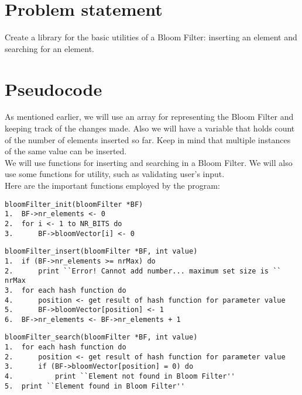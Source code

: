 \documentclass[14pt]{article}
\begin{document}
\section*{Problem statement}
Create a library for the basic utilities of a Bloom Filter: inserting an element and searching for an element.
\vspace {10 mm}

\section*{Pseudocode}
As mentioned earlier, we will use an array for representing the Bloom Filter and keeping track of the changes made. Also we will have a variable that holds count of the number of elements inserted so far. Keep in mind that multiple instances of the same value can be inserted.
\\
We will use functions for inserting and searching in a Bloom Filter. We will also use some functions for utility, such as validating user's input.
\\
Here are the important functions employed by the program:
\begin{lstlisting}
bloomFilter_init(bloomFilter *BF)
1.	BF->nr_elements <- 0
2.	for i <- 1 to NR_BITS do
3.		BF->bloomVector[i] <- 0
\end{lstlisting}
\begin{lstlisting}
bloomFilter_insert(bloomFilter *BF, int value)
1. 	if (BF->nr_elements >= nrMax) do
2. 		print ``Error! Cannot add number... maximum set size is `` nrMax
3. 	for each hash function do
4. 		position <- get result of hash function for parameter value
5. 		BF->bloomVector[position] <- 1
6. 	BF->nr_elements <- BF->nr_elements + 1
\end{lstlisting}
\begin{lstlisting}
bloomFilter_search(bloomFilter *BF, int value)
1.	for each hash function do
2. 		position <- get result of hash function for parameter value
3. 		if (BF->bloomVector[position] = 0) do
4. 			print ``Element not found in Bloom Filter''
5. 	print ``Element found in Bloom Filter''
\end{lstlisting}


\newpage
\end{document}
